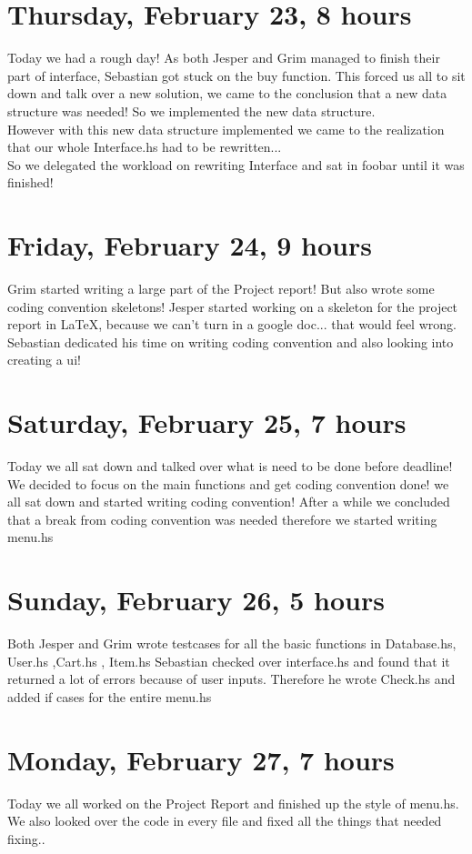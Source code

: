 \documentclass[11pt]{article}
\begin{document}
\section*{Thursday, February 23, 8 hours}
Today we had a rough day! As both Jesper and Grim managed to finish their part of interface, Sebastian got stuck on the buy function.
This forced us all to sit down and talk over a new solution, we came to the conclusion that a new data structure was needed! So we implemented the new data structure. \\
However with this new data structure implemented we came to the realization that our whole Interface.hs had to be rewritten...\\
So we delegated the workload on rewriting Interface and sat in foobar until it was finished!
\section*{Friday, February 24, 9 hours}
Grim started writing a large part of the Project report! But also wrote some coding convention skeletons!
Jesper started working on a skeleton for the project report in LaTeX, because we can't turn in a google doc... that would feel wrong.
Sebastian dedicated his time on writing coding convention and also looking into creating a ui!
\section*{Saturday, February 25, 7 hours}
Today we all sat down and talked over what is need to be done before deadline!
We decided to focus on the main functions and get coding convention done! we all sat down and started writing coding convention!
After a while we concluded that a break from coding convention was needed therefore we started writing menu.hs
\section*{Sunday, February 26, 5 hours}
Both Jesper and Grim wrote testcases for all the basic functions in Database.hs, User.hs ,Cart.hs , Item.hs
Sebastian checked over interface.hs and found that it returned a lot of errors because of user inputs. Therefore he wrote Check.hs and added if cases for the entire menu.hs
\section*{Monday, February 27, 7 hours}
Today we all worked on the Project Report and finished up the style of menu.hs. We also looked over the code in every file and fixed all the things that needed fixing..
\end{document}
